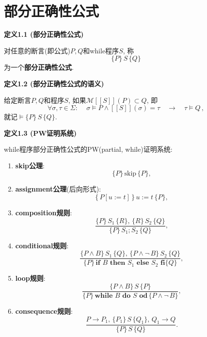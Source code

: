\documentclass[UTF8]{ctexart}
\begin{document}
\setlength{\abovedisplayskip}{1pt}
\setlength{\belowdisplayskip}{1pt}

\section{部分正确性公式}

\hypertarget{sec:定义1.1}{}
\noindent\textbf{定义1.1 (部分正确性公式)}

对任意的断言(即公式)$P,Q$和while程序$S$, 称
\[
    \{P\}\,S\,\{Q\}
\]
为一个\textbf{部分正确性公式}.

\vspace{10pt}

\hypertarget{sec:定义1.2}{}
\noindent\textbf{定义1.2 (部分正确性公式的语义)}

给定断言$P,Q$和程序$S$, 如果$\mathcal{M}[\![S]\!](P)\subset Q$, 即
\[
    \forall\sigma,\tau\in\Sigma:\quad
    \,\sigma\models P\land [\![S]\!](\sigma)=\tau\quad\to\quad\tau\models Q\,,
\]
就记$\models\{P\}\,S\,\{Q\}$.

\vspace{10pt}

\hypertarget{sec:定义1.3}{}
\noindent\textbf{定义1.3 (PW证明系统)}

while程序部分正确性公式的PW(partial, while)证明系统:
\begin{enumerate}
    \item \textbf{skip公理}:
    \[
        \{P\}\,\mathrm{skip}\,\{P\},
    \]
    \item \textbf{assignment公理}(后向形式):
    \[
        \{\,P[u:=t]\,\}\,u:=t\,\{P\},
    \]
    \item \textbf{composition规则}:
    \[
        \frac{\{P\}\,S_1\,\{R\},\,\{R\}\,S_2\,\{Q\}}
        {\{P\}\,S_1;S_2\,\{Q\}},
    \]
    \item \textbf{conditional规则}:
    \[
        \frac{\{P\land B\}\,S_1\,\{Q\},\,\{P\land\neg\,B\}\,S_2\,\{Q\}}
        {\{P\}\,\mathbf{if}\,\,B\,\,\mathbf{then}\,\,S_1\,\,\mathbf{else}
        \,\,S_2\,\,\mathbf{fi}\{Q\}},
    \]
    \item \textbf{loop规则}:
    \[
        \frac{\{P\land B\}\,S\,\{P\}}
        {\{P\}\,\mathbf{while}\,\,B\,\,\mathbf{do}\,\,S\,\,\mathbf{od}\,
        \{P\land\neg\,B\}},
    \]
    \item \textbf{consequence规则}:
    \[
        \frac{P\to P_1,\,\{P_1\}\,S\,\{Q_1\},\,Q_1\to Q}
        {\{P\}\,S\,\{Q\}}.
    \]
\end{enumerate}

\vspace{15pt}
\end{document}
